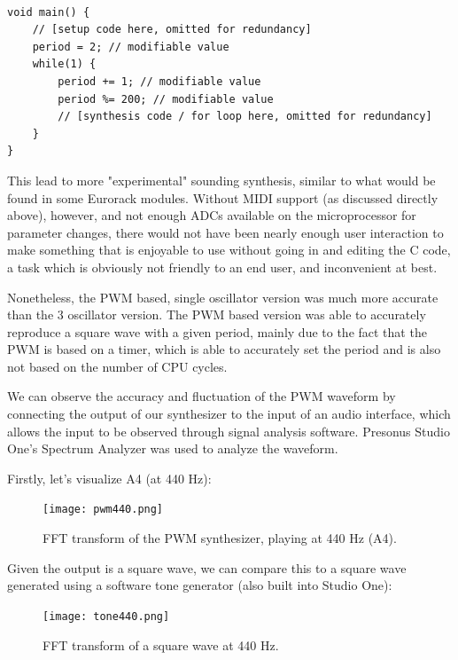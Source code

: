 \documentclass[12pt]{article}
\begin{document}
\begin{lstlisting}

void main() {
    // [setup code here, omitted for redundancy]
    period = 2; // modifiable value
    while(1) {
        period += 1; // modifiable value
        period %= 200; // modifiable value
        // [synthesis code / for loop here, omitted for redundancy]
    }
}
\end{lstlisting}

This lead to more "experimental" sounding synthesis, similar to what would be found in some Eurorack modules. Without MIDI support (as discussed directly above), however, and not enough ADCs available on the microprocessor for parameter changes, there would not have been nearly enough user interaction to make something that is enjoyable to use without going in and editing the C code, a task which is obviously not friendly to an end user, and inconvenient at best. 

Nonetheless, the PWM based, single oscillator version was much more accurate than the 3 oscillator version.
The PWM based version was able to accurately reproduce a square wave with a given period, mainly due to the fact that the PWM is based on a timer, which is able to accurately set the period and is also not based on the number of CPU cycles.

We can observe the accuracy and fluctuation of the PWM waveform by connecting the output of our synthesizer to the input of an audio interface, which allows the input to be observed through signal analysis software. Presonus Studio One's Spectrum Analyzer was used to analyze the waveform. 

Firstly, let's visualize A4 (at 440 Hz):

\begin{figure}[H]
    \centering
    \texttt{[image: pwm440.png]}
    \caption{FFT transform of the PWM synthesizer, playing at 440 Hz (A4). }
    \label{fig:pwm440}
\end{figure}

Given the output is a square wave, we can compare this to a square wave generated using a software tone generator (also built into Studio One):

\begin{figure}[H]
    \centering
    \texttt{[image: tone440.png]}
    \caption{FFT transform of a square wave at 440 Hz. }
    \label{fig:tone440}
\end{figure}

\end{document}
